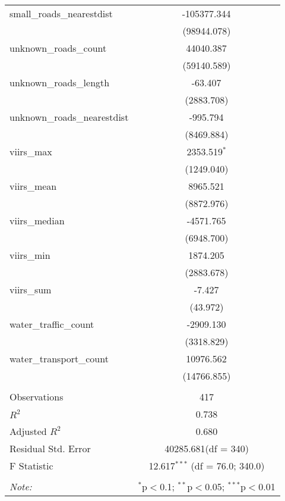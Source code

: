 \begin{table}[!htbp]
\begin{tabular}{@{\extracolsep{5pt}}lc}
 small_roads_nearestdist & -105377.344$^{}$ \\
  & (98944.078) \\
 unknown_roads_count & 44040.387$^{}$ \\
  & (59140.589) \\
 unknown_roads_length & -63.407$^{}$ \\
  & (2883.708) \\
 unknown_roads_nearestdist & -995.794$^{}$ \\
  & (8469.884) \\
 viirs_max & 2353.519$^{*}$ \\
  & (1249.040) \\
 viirs_mean & 8965.521$^{}$ \\
  & (8872.976) \\
 viirs_median & -4571.765$^{}$ \\
  & (6948.700) \\
 viirs_min & 1874.205$^{}$ \\
  & (2883.678) \\
 viirs_sum & -7.427$^{}$ \\
  & (43.972) \\
 water_traffic_count & -2909.130$^{}$ \\
  & (3318.829) \\
 water_transport_count & 10976.562$^{}$ \\
  & (14766.855) \\
\hline \\[-1.8ex]
 Observations & 417 \\
 $R^2$ & 0.738 \\
 Adjusted $R^2$ & 0.680 \\
 Residual Std. Error & 40285.681(df = 340)  \\
 F Statistic & 12.617$^{***}$ (df = 76.0; 340.0) \\
\hline
\hline \\[-1.8ex]
\textit{Note:} & \multicolumn{1}{r}{$^{*}$p$<$0.1; $^{**}$p$<$0.05; $^{***}$p$<$0.01} \\
\end{tabular}
\end{table}
